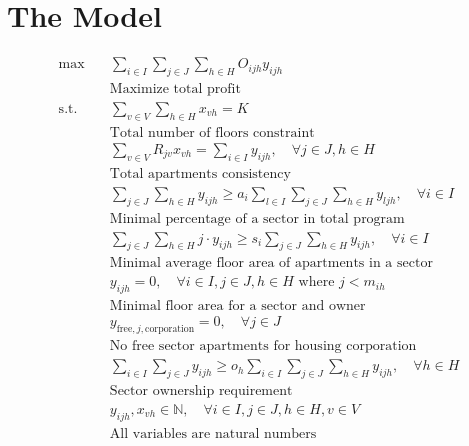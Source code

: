 \documentclass{article}
\begin{document}
\section{The Model}
\begin{align*}
    \max \quad & \sum_{i \in I} \sum_{j \in J} \sum_{h \in H} O_{ijh} y_{ijh} \\
    & \text{Maximize total profit} \\[6pt]
    \text{s.t.} \quad & \sum_{v \in V}  \sum_{h \in H} x_{vh} = K \\
    & \text{Total number of floors constraint} \\[6pt]
    & \sum_{v \in V} R_{jv} x_{vh} = \sum_{i \in I}  y_{ijh}, \quad \forall j \in J, h \in H \\
    & \text{Total apartments consistency} \\[6pt]
    & \sum_{j \in J} \sum_{h \in H} y_{ijh} \geq a_i \sum_{l \in I} \sum_{j \in J} \sum_{h \in H} y_{ljh}, \quad \forall i \in I \\
    & \text{Minimal percentage of a sector in total program} \\[6pt]
    & \sum_{j \in J} \sum_{h \in H} j \cdot y_{ijh} \geq s_i \sum_{j \in J} \sum_{h \in H} y_{ijh}, \quad \forall i \in I \\
    & \text{Minimal average floor area of apartments in a sector} \\[6pt]
    & y_{ijh} = 0, \quad \forall i \in I, j \in J, h \in H \text{ where } j < m_{ih} \\
    & \text{Minimal floor area for a sector and owner} \\[6pt]
    & y_{\text{free},j,\text{corporation}} = 0, \quad \forall j \in J \\
    & \text{No free sector apartments for housing corporation} \\[6pt]
    & \sum_{i \in I} \sum_{j \in J} y_{ijh} \geq o_h \sum_{i \in I} \sum_{j \in J} \sum_{h \in H} y_{ijh}, \quad \forall h \in H \\
    & \text{Sector ownership requirement} \\[6pt]
    &  y_{ijh}, x_{vh} \in \mathbb{N}, \quad \forall i \in I, j \in J, h \in H, v \in V \\
    & \text{All variables are natural numbers}
\end{align*}
\end{document}
